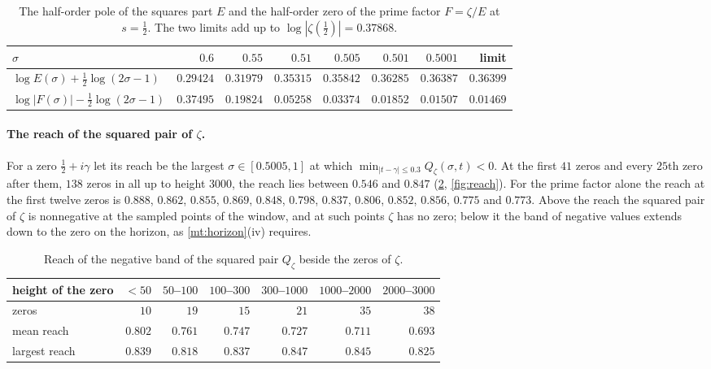 \documentclass[11pt]{article}
\theoremstyle{definition}\newtheorem{definition}[theorem]{Definition}
\theoremstyle{remark}\newtheorem{remark}[theorem]{Remark}
\theoremstyle{definition}\newtheorem{axiom}{Axiom}
\begin{document}
\begin{table}[!htbp]\centering\small
\begin{tabular}{@{}lrrrrrrr@{}}\toprule
$\sigma$ & $0.6$ & $0.55$ & $0.51$ & $0.505$ & $0.501$ & $0.5001$ & limit\\\midrule
$\log E(\sigma)+\frac12\log(2\sigma-1)$ & $0.29424$ & $0.31979$ & $0.35315$ & $0.35842$ & $0.36285$ & $0.36387$ & $0.36399$\\
$\log|F(\sigma)|-\frac12\log(2\sigma-1)$ & $0.37495$ & $0.19824$ & $0.05258$ & $0.03374$ & $0.01852$ & $0.01507$ & $0.01469$\\\bottomrule
\end{tabular}
\caption{The half-order pole of the squares part $E$ and the half-order zero of the prime factor $F=\zeta/E$ at $s=\frac12$. The two limits add up to $\log|\zeta(\frac12)|=0.37868$.}\label{tab:halforder}
\end{table}

\paragraph{The reach of the squared pair of $\zeta$.} For a zero $\frac12+i\gamma$ let its reach be the largest $\sigma\in[0.5005,1]$ at which $\min_{|t-\gamma|\le0.3}Q_\zeta(\sigma,t)<0$. At the first $41$ zeros and every $25$th zero after them, $138$ zeros in all up to height $3000$, the reach lies between $0.546$ and $0.847$ (\cref{tab:reach}, \cref{fig:reach}). For the prime factor alone the reach at the first twelve zeros is $0.888$, $0.862$, $0.855$, $0.869$, $0.848$, $0.798$, $0.837$, $0.806$, $0.852$, $0.856$, $0.775$ and $0.773$. Above the reach the squared pair of $\zeta$ is nonnegative at the sampled points of the window, and at such points $\zeta$ has no zero; below it the band of negative values extends down to the zero on the horizon, as \cref{mt:horizon}(iv) requires.

\begin{table}[!htbp]\centering\small
\begin{tabular}{@{}lrrrrrr@{}}\toprule
height of the zero & $<50$ & $50$--$100$ & $100$--$300$ & $300$--$1000$ & $1000$--$2000$ & $2000$--$3000$\\\midrule
zeros & $10$ & $19$ & $15$ & $21$ & $35$ & $38$\\
mean reach & $0.802$ & $0.761$ & $0.747$ & $0.727$ & $0.711$ & $0.693$\\
largest reach & $0.839$ & $0.818$ & $0.837$ & $0.847$ & $0.845$ & $0.825$\\\bottomrule
\end{tabular}
\caption{Reach of the negative band of the squared pair $Q_\zeta$ beside the zeros of $\zeta$.}\label{tab:reach}
\end{table}
\end{document}
